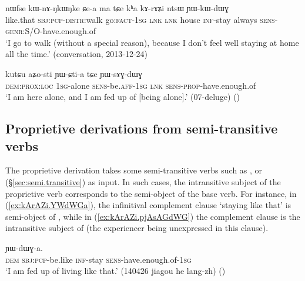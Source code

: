\begin{exe}
\ex \label{ex:kArAZi.YWkWdWG}
\gll nɯfse kɯ-nɤ-ŋkɯ\redp{}ŋke ɕe-a ma tɕe kʰa kɤ-rɤʑi ntsɯ ɲɯ-kɯ-dɯɣ \\
like.that \textsc{sbj}:\textsc{pcp}-\textsc{distr}:walk go:\textsc{fact}-\textsc{1sg} \textsc{lnk} \textsc{lnk} house \textsc{inf}-stay always \textsc{sens}-\textsc{genr}:S/O-have.enough.of \\
\glt `I go to walk (without a special reason), because I don't feel well staying at home all the time.' (conversation, 2013-12-24)
\end{exe}

\begin{exe}
\ex \label{ex:aZosti.YWsAGdWG}
\gll kutɕu aʑo-sti ɲɯ-ɕti-a tɕe ɲɯ-sɤɣ-dɯɣ \\
\textsc{dem}:\textsc{prox}:\textsc{loc} \textsc{1sg}-alone \textsc{sens}-be.\textsc{aff}-\textsc{1sg} \textsc{lnk} \textsc{sens}-\textsc{prop}-have.enough.of \\
\glt `I am here alone, and I am fed up of [being alone].' (07-deluge) ()
\end{exe}

\subsection{Proprietive derivations from semi-transitive verbs} \label{sec:proprietive.semi.tr}
The proprietive derivation takes some semi-transitive verbs such as ,  or  (§\ref{sec:semi.transitive}) as input. In such cases, the intransitive subject of the proprietive verb corresponds to the semi-object of the base verb. For instance, in (\ref{ex:kArAZi.YWdWGa}), the infinitival complement clause  `staying like that' is semi-object of , while in (\ref{ex:kArAZi.pjAsAGdWG}) the complement clause is the intransitive subject of  (the experiencer being unexpressed in this clause).

\begin{exe}
\ex \label{ex:kArAZi.YWdWGa}
 ɲɯ-dɯɣ-a. \\
\textsc{dem} \textsc{sbj}:\textsc{pcp}-be.like \textsc{inf}-stay \textsc{sens}-have.enough.of-\textsc{1sg} \\
\glt `I am fed up of living like that.' (140426 jiagou he lang-zh) ()
\end{exe}


